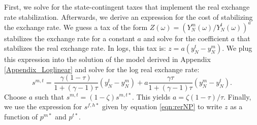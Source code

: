 First, we solve for the state-contingent taxes that implement the real
exchange rate stabilization. Afterwards, we derive an expression for
the cost of stabilizing the exchange rate. We guess a tax of the form
$Z(\omega) = \left( Y_N^m(\omega) / Y_N^t(\omega) \right)^a$
stabilizes the exchange rate for a constant $a$ and solve for the
coefficient $a$ that stabilizes the real exchange rate. In logs, this
tax is: $z = a \left( y_N^t - y_N^m \right)$. We plug this expression
into the solution of the model derived in Appendix
\ref{Appendix_Loglinear} and solve for the log real exchange rate:
\begin{equation*}
  s^{m, t} = 
  \frac{\gamma (1 - \tau)}{1 + (\gamma - 1) \tau} \left( y_N^t - y_N^m \right) 
  + a \frac{\gamma \tau}{1 + (\gamma - 1) \tau} \left( y_N^m - y_N^t \right). 
\end{equation*}
Choose $a$ such that $s^{m, t} = (1 - \zeta) s^{m, t \ast}$. This
yields $a = \zeta (1 - \tau) / \tau$. Finally, we use the expression
for $s^{f, h \ast}$ given by equation \eqref{eqn:rerNP} to write $z$
as a function of $p^{m \ast}$ and $p^{t \ast}$.


